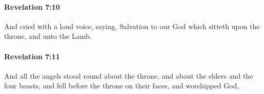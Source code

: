 		\paragraph{Revelation 7:10} %
			\label{REVELATIONNT-7-10}

			And cried with a loud voice, saying, Salvation to our God which sitteth upon the throne, and unto the Lamb.

			\begin{framed}
			\scriptsize
				\begin{compactdesc}
					\item[SBLG] 
				\end{compactdesc}
			\end{framed}

		\paragraph{Revelation 7:11} %
			\label{REVELATIONNT-7-11}

			And all the angels stood round about the throne, and about the elders and the four beasts, and fell before the throne on their faces, and worshipped God,

